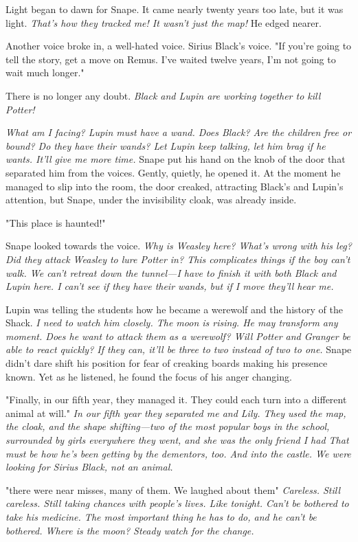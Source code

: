 Light began to dawn for Snape. It came nearly twenty years too late, but it was light. \emph{That's how they tracked me! It wasn't just the map!} He edged nearer.

Another voice broke in, a well-hated voice. Sirius Black's voice. "If you're going to tell the story, get a move on Remus. I've waited twelve years, I'm not going to wait much longer."

There is no longer any doubt. \emph{Black and Lupin are working together to kill Potter!}

\emph{What am I facing? Lupin must have a wand. Does Black? Are the children free or bound? Do they have their wands? Let Lupin keep talking, let him brag if he wants. It'll give me more time.} Snape put his hand on the knob of the door that separated him from the voices. Gently, quietly, he opened it. At the moment he managed to slip into the room, the door creaked, attracting Black's and Lupin's attention, but Snape, under the invisibility cloak, was already inside.

"This place is haunted!"

Snape looked towards the voice. \emph{Why is Weasley here? What's wrong with his leg? Did they attack Weasley to lure Potter in? This complicates things if the boy can't walk. We can't retreat down the tunnel—I have to finish it with both Black and Lupin here. I can't see if they have their wands, but if I move they'll hear me.}

Lupin was telling the students how he became a werewolf and the history of the Shack. \emph{I need to watch him closely. The moon is rising. He may transform any moment. Does he want to attack them as a werewolf? Will Potter and Granger be able to react quickly? If they can, it'll be three to two instead of two to one.} Snape didn't dare shift his position for fear of creaking boards making his presence known. Yet as he listened, he found the focus of his anger changing.

"{\el}Finally, in our fifth year, they managed it. They could each turn into a different animal at will." \emph{In our fifth year they separated me and Lily. They used the map, the cloak, and the shape shifting—two of the most popular boys in the school, surrounded by girls everywhere they went, and she was the only friend I had{\el} That must be how he's been getting by the dementors, too. And into the castle. We were looking for Sirius Black, not an animal.}

"{\el}there were near misses, many of them. We laughed about them{\el}" \emph{Careless. Still careless. Still taking chances with people's lives. Like tonight. Can't be bothered to take his medicine. The most important thing he has to do, and he can't be bothered. Where is the moon? Steady{\el} watch for the change.}

